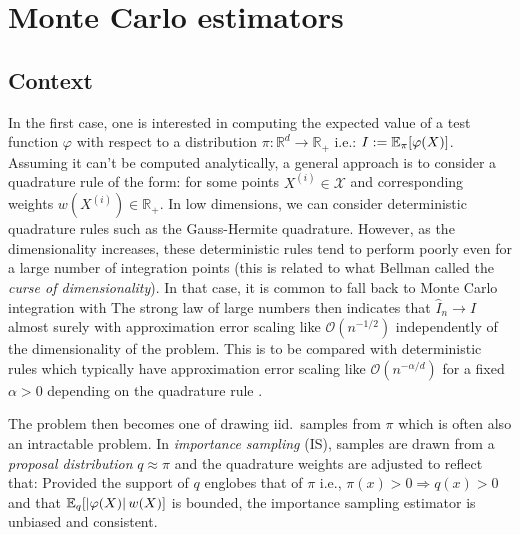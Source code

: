 
\section{Monte Carlo estimators}

\subsection{Context}

In the first case, one is interested in computing the expected value of a test function $\varphi$ with respect to a distribution $\pi:\mathbb R^{d} \to \mathbb R_+$ i.e.: $I:=\mathbb E_\pi[\varphi(X)]$. Assuming it can't be computed analytically, a general approach is to consider a quadrature rule of the form:
%
%
for some points $X^{(i)}\in\mathcal X$ and corresponding weights $w(X^{(i)})\in\mathbb R_+$. In low dimensions, we can consider deterministic quadrature rules such as the Gauss-Hermite quadrature. However, as the dimensionality increases, these deterministic rules tend to perform poorly even for a large number of integration points (this is related to what Bellman called the \emph{curse of dimensionality}). In that case, it is common to fall back to Monte Carlo integration with
%
%
The strong law of large numbers then indicates that $\widehat I_n\to I$ almost surely with approximation error scaling like $\mathcal O(n^{-1/2})$ independently of the dimensionality of the problem. This is to be compared with deterministic rules which typically have approximation error scaling like $\mathcal O(n^{-\alpha/d})$ for a fixed $\alpha>0$ depending on the quadrature rule \citep{caflisch98}.

The problem then becomes one of drawing iid.\ samples from $\pi$ which is often also an intractable problem. In \emph{importance sampling} (IS), samples are drawn from a \emph{proposal distribution} $q\approx \pi$ and the quadrature weights are adjusted to reflect that:
%
%
Provided the support of $q$ englobes that of $\pi$ i.e., $\pi(x)>0\Rightarrow q(x)>0$ and that $\mathbb E_q[\left|\varphi(X)\right|w(X)]$ is bounded, the importance sampling estimator is unbiased and consistent.


